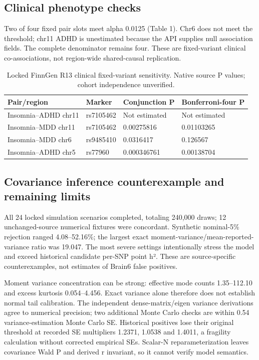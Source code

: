 \documentclass[11pt]{article}
\begin{document}
\subsection*{Clinical phenotype checks}
Two of four fixed pair slots meet alpha 0.0125 (Table 1). Chr6 does not meet the threshold; chr11 ADHD is unestimated because the API supplies null association fields. The complete denominator remains four. These are fixed-variant clinical co-associations, not region-wide shared-causal replication.

\begin{table}[htbp]\centering\small
\caption{Locked FinnGen R13 clinical fixed-variant sensitivity. Native source P values; cohort independence unverified.}\begin{tabular}{llll}\toprule
Pair/region & Marker & Conjunction P & Bonferroni-four P\\\midrule
Insomnia--ADHD chr11 & rs7105462 & Not estimated & Not estimated\\
Insomnia--MDD chr11 & rs7105462 & 0.00275816 & 0.01103265\\
Insomnia--MDD chr6 & rs9485410 & 0.0316417 & 0.126567\\
Insomnia--ADHD chr5 & rs77960 & 0.000346761 & 0.00138704\\\bottomrule
\end{tabular}\end{table}

\subsection*{Covariance inference counterexample and remaining limits}
All 24 locked simulation scenarios completed, totaling 240,000 draws; 12 unchanged-source numerical fixtures were concordant. Synthetic nominal-5\% rejection ranged 4.08--52.16\%; the largest exact moment-variance/mean-reported-variance ratio was 19.047. The most severe settings intentionally stress the model and exceed historical candidate per-SNP point h². These are source-specific counterexamples, not estimates of Brain6 false positives.

Moment variance concentration can be strong: effective mode counts 1.35--112.10 and excess kurtosis 0.054--4.456. Exact variance alone therefore does not establish normal tail calibration. The independent dense-matrix/eigen variance derivations agree to numerical precision; two additional Monte Carlo checks are within 0.54 variance-estimation Monte Carlo SE. Historical positives lose their original threshold at recorded SE multipliers 1.2371, 1.0538 and 1.4011, a fragility calculation without corrected empirical SEs. Scalar-N reparameterization leaves covariance Wald P and derived r invariant, so it cannot verify model semantics.
\end{document}
